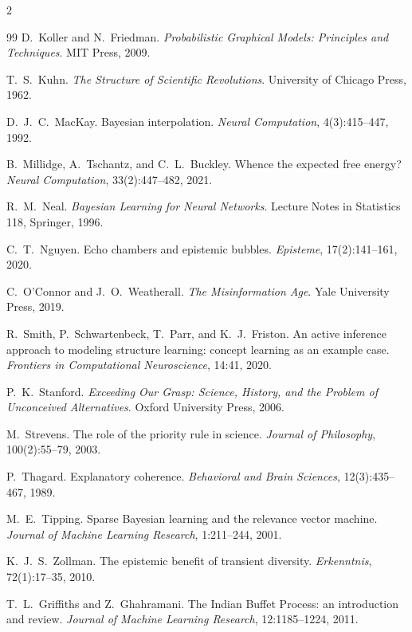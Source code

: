\documentclass[11pt]{article}
\begin{document}
\begin{multicols}{2}
\begin{thebibliography}{99}
D.~Koller and N.~Friedman.
\emph{Probabilistic Graphical Models: Principles and Techniques}. MIT Press, 2009.

T.~S.~Kuhn.
\emph{The Structure of Scientific Revolutions}. University of Chicago Press, 1962.

D.~J.~C.~MacKay.
Bayesian interpolation. \emph{Neural Computation}, 4(3):415--447, 1992.

B.~Millidge, A.~Tschantz, and C.~L.~Buckley.
Whence the expected free energy? \emph{Neural Computation}, 33(2):447--482, 2021.

R.~M.~Neal.
\emph{Bayesian Learning for Neural Networks}.
Lecture Notes in Statistics 118, Springer, 1996.

C.~T.~Nguyen.
Echo chambers and epistemic bubbles. \emph{Episteme}, 17(2):141--161, 2020.

C.~O'Connor and J.~O.~Weatherall.
\emph{The Misinformation Age}. Yale University Press, 2019.

R.~Smith, P.~Schwartenbeck, T.~Parr, and K.~J.~Friston.
An active inference approach to modeling structure learning: concept learning as an example case.
\emph{Frontiers in Computational Neuroscience}, 14:41, 2020.

P.~K.~Stanford.
\emph{Exceeding Our Grasp: Science, History, and the Problem of Unconceived Alternatives}.
Oxford University Press, 2006.

M.~Strevens.
The role of the priority rule in science. \emph{Journal of Philosophy}, 100(2):55--79, 2003.

P.~Thagard.
Explanatory coherence. \emph{Behavioral and Brain Sciences}, 12(3):435--467, 1989.

M.~E.~Tipping.
Sparse Bayesian learning and the relevance vector machine.
\emph{Journal of Machine Learning Research}, 1:211--244, 2001.

K.~J.~S.~Zollman.
The epistemic benefit of transient diversity. \emph{Erkenntnis}, 72(1):17--35, 2010.

T.~L.~Griffiths and Z.~Ghahramani.
The Indian Buffet Process: an introduction and review.
\emph{Journal of Machine Learning Research}, 12:1185--1224, 2011.


\end{thebibliography}
\end{multicols}
\end{document}
